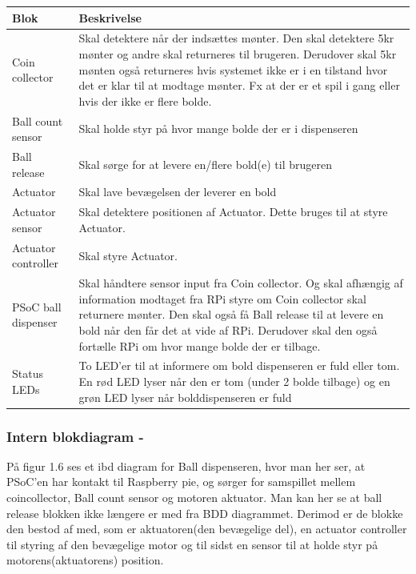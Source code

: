 \documentclass[Arkitektur/System_main.tex]{subfiles}
\begin{document}
\begin{table}[H]
\begin{tabular}{L{0.2\columnwidth}|L{0.8\columnwidth}}
\hline
\textbf{Blok} & \textbf{Beskrivelse} \\ \hline

Coin collector & Skal detektere når der indsættes mønter. Den skal detektere 5kr mønter og andre skal returneres til brugeren. Derudover skal 5kr mønten også returneres hvis systemet ikke er i en tilstand hvor det er klar til at modtage mønter. Fx at der er et spil i gang eller hvis der ikke er flere bolde.\\ \hline
Ball count sensor & Skal holde styr på hvor mange bolde der er i dispenseren\\ \hline
Ball release & Skal sørge for at levere en/flere bold(e) til brugeren\\ \hline
Actuator & Skal lave bevægelsen der leverer en bold \\ \hline
Actuator sensor & Skal detektere positionen af Actuator. Dette bruges til at styre Actuator.\\ \hline
Actuator controller & Skal styre Actuator.\\ \hline
PSoC ball dispenser & Skal håndtere sensor input fra Coin collector. Og skal afhængig af information modtaget fra RPi styre om Coin collector skal returnere mønter. Den skal også få Ball release til at levere en bold når den får det at vide af RPi. Derudover skal den også fortælle RPi om hvor mange bolde der er tilbage. \\ \hline
Status LEDs & To LED'er til at informere om bold dispenseren er fuld eller tom. En rød LED lyser når den er tom (under 2 bolde tilbage) og en grøn LED lyser når bolddispenseren er fuld\\ \hline
\end{tabular}
\end{table}

\subsubsection{Intern blokdiagram - }

På figur 1.6 ses et ibd diagram for Ball dispenseren, hvor man her ser, at PSoC'en har kontakt til Raspberry pie, og sørger for samspillet mellem coincollector, Ball count sensor og motoren aktuator. Man kan her se at ball release blokken ikke længere er med fra BDD diagrammet. Derimod er de blokke den bestod af med, som er aktuatoren(den bevægelige del), en actuator controller til styring af den bevægelige motor og til sidst en sensor til at holde styr på motorens(aktuatorens) position.
\end{document}

